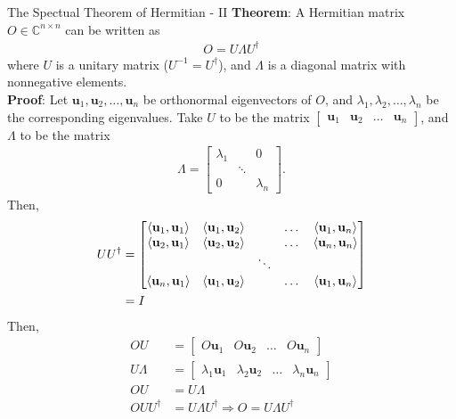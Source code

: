 \documentclass{beamer}
\begin{document}
\begin{frame}{The Spectual Theorem of Hermitian - II\tiny{\cite{thespectraltheoremforhermitianmatrice}}}
  {\tiny
    \textbf{Theorem}: A Hermitian matrix $O \in \mathbb{C}^{n \times n}$ can be written as
    \begin{align*}
      O = U \Lambda U^{\dagger}
    \end{align*}
    where $U$ is a unitary matrix ($U^{-1} = U^{\dagger}$), and $\Lambda$ is a diagonal matrix with nonnegative elements. \\
    \textbf{Proof}:
    Let $\mathbf{u}_1, \mathbf{u}_2, \dots, \mathbf{u}_n$ be orthonormal eigenvectors of $O$,
    and $\lambda_1, \lambda_2, \dots, \lambda_n$ be the corresponding eigenvalues.
    Take $U$ to be the matrix $\begin{bmatrix} \mathbf{u}_1 & \mathbf{u}_2 & \dots & \mathbf{u}_n\end{bmatrix}$,
    and $\Lambda$ to be the matrix
    \begin{align*}
      \Lambda =
                \begin{bmatrix}
                  \lambda_1 &  & 0 \\
                  & \ddots & \\
                  0 & &  \lambda_n
                \end{bmatrix}.
    \end{align*}
    Then,
    \begin{align*}
      UU^{\dagger} &= 
                \begin{bmatrix}
                  \braket{\mathbf{u}_1, \mathbf{u}_1} & \braket{\mathbf{u}_1, \mathbf{u}_2} &         & \dots & \braket{\mathbf{u}_1, \mathbf{u}_n} \\
                  \braket{\mathbf{u}_2, \mathbf{u}_1} & \braket{\mathbf{u}_2, \mathbf{u}_2} &         & \dots & \braket{\mathbf{u}_n, \mathbf{u}_n} \\
                                                      &                                     &  \ddots &       &                                     \\
                  \braket{\mathbf{u}_n, \mathbf{u}_1} & \braket{\mathbf{u}_1, \mathbf{u}_2} &         & \dots & \braket{\mathbf{u}_1, \mathbf{u}_n}
                \end{bmatrix} \\
                &= I
    \end{align*}
    Then,
    \begin{align*}
      OU &= \begin{bmatrix} O\mathbf{u}_1 & O\mathbf{u}_2 & \dots & O\mathbf{u}_n \end{bmatrix} \\
      U\Lambda &= \begin{bmatrix} \lambda_1 \mathbf{u}_1 & \lambda_2 \mathbf{u}_2 & \dots & \lambda_n \mathbf{u}_n \end{bmatrix} \\
      OU &= U\Lambda \\
      OUU^{\dagger} &= U\Lambda U^{\dagger} \Rightarrow O = U \Lambda U^{\dagger}
    \end{align*}
  }%
\end{frame}
\end{document}
